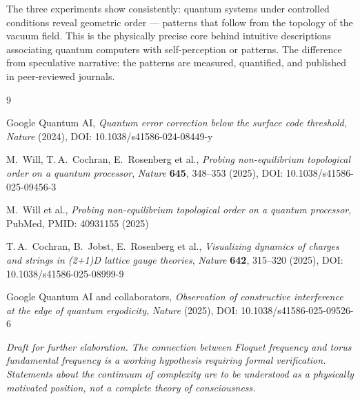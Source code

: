 The three experiments show consistently: quantum systems under controlled conditions
reveal geometric order — patterns that follow from the topology of the vacuum field.
This is the physically precise core behind intuitive descriptions associating quantum
computers with self-perception or patterns. The difference from speculative narrative:
the patterns are measured, quantified, and published in peer-reviewed journals.

\vspace{0.8cm}

\begin{thebibliography}{9}

Google Quantum AI,
\textit{Quantum error correction below the surface code threshold},
\textit{Nature} (2024), DOI: 10.1038/s41586-024-08449-y

M.~Will, T.\,A.~Cochran, E.~Rosenberg et al.,
\textit{Probing non-equilibrium topological order on a quantum processor},
\textit{Nature} \textbf{645}, 348--353 (2025),
DOI: 10.1038/s41586-025-09456-3

M.~Will et al.,
\textit{Probing non-equilibrium topological order on a quantum processor},
PubMed, PMID: 40931155 (2025)

T.\,A.~Cochran, B.~Jobst, E.~Rosenberg et al.,
\textit{Visualizing dynamics of charges and strings in (2+1)D lattice gauge theories},
\textit{Nature} \textbf{642}, 315--320 (2025),
DOI: 10.1038/s41586-025-08999-9

Google Quantum AI and collaborators,
\textit{Observation of constructive interference at the edge of quantum ergodicity},
\textit{Nature} (2025), DOI: 10.1038/s41586-025-09526-6

\end{thebibliography}

\vspace{0.5cm}
\noindent
\textit{Draft for further elaboration. The connection between Floquet frequency
and torus fundamental frequency is a working hypothesis requiring formal verification.
Statements about the continuum of complexity are to be understood as a physically
motivated position, not a complete theory of consciousness.}
